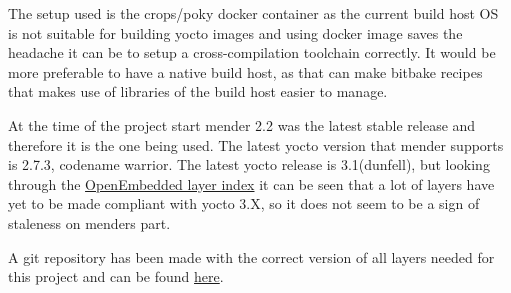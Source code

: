 \documentclass[../../main.tex]{subfiles}
\begin{document}
The setup used is the crops/poky docker container as the current build host OS is
not suitable for building yocto images and using docker image saves the headache it can be to
setup a cross-compilation toolchain correctly.
It would be more preferable to have a native build host, as that can make bitbake recipes
that makes use of libraries of the build host easier to manage.

At the time of the project start mender 2.2 was the latest stable release and therefore it
is the one being used.
The latest yocto version that mender supports is 2.7.3, codename warrior.
The latest yocto release is 3.1(dunfell), but looking through the
\href{https://layers.openembedded.org/layerindex/branch/master/layers/}{OpenEmbedded layer index}
it can be seen that a lot of layers have yet to be made compliant with yocto 3.X, so it does not
seem to be a sign of staleness on menders part.

A git repository has been made with the correct version of all layers needed for this project and
can be found \href{https://github.com/askebm/YoctoMenderMclurs.git}{here}.\\
\end{document}

